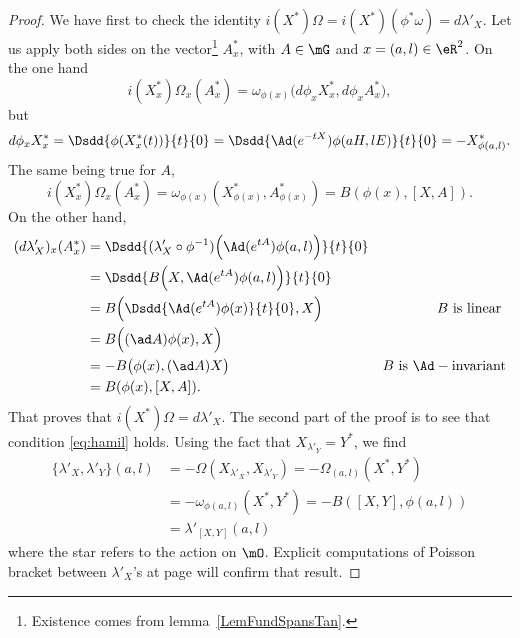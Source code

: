 \begin{proof}
We have first to check the identity $i(X^*)\Omega=i(X^*)(\phi^*\omega)=d\lambda'_X$. Let us apply both sides on the vector\footnote{Existence comes from lemma~\ref{LemFundSpansTan}.} $A^*_x$, with $A\in\mG$ and $x=(a,l)\in\eR^2$. On the one hand
\[
  i(X^*_x)\Omega_x(A^*_x)=\omega_{\phi(x)}\big(   d\phi_xX^*_x,d\phi_xA^*_x   \big),
\]
but
\begin{equation}
  d\phi_xX^*_x=\Dsdd{\phi(X^*_x(t))}{t}{0}
              =\Dsdd{ \Ad(e^{-tX})\phi(aH,lE) }{t}{0}
          =-X^*_{\phi(a,l)}.
\end{equation}
The same being true for $A$,
\[
  i(X^*_x)\Omega_x(A^*_x)=\omega_{\phi(x)}(X^*_{\phi(x)},A^*_{\phi(x)})=B(\phi(x),[X,A]).
\]
On the other hand,
\begin{equation}
\begin{aligned}
    (d\lambda'_X)_x(A^*_x)&=\Dsdd{ (\lambda'_X\circ\phi^{-1})\Big(   \Ad(e^{tA})\phi(a,l)   \Big) }{t}{0}\\
                         &=\Dsdd{  B\Big(X,\Ad(e^{tA})\phi(a,l) \Big)  }{t}{0} \\
                         &=B\Big(  \Dsdd{\Ad(e^{tA})\phi(x)}{t}{0},X   \Big)    & B\text{ is linear }\\
             &=B\Big(  (\ad A)\phi(x),X   \Big)\\
             &=-B\big(\phi(x),(\ad A)X\big) &   B\text{ is }\Ad-\text{invariant}   \\
             &=B(\phi(x),[X,A]).
\end{aligned}
\end{equation}
That proves that $i(X^*)\Omega=d\lambda'_X$.  The second part of the proof is to see that condition \eqref{eq:hamil} holds.  Using the fact that $X_{\lambda'_Y}=Y^*$, we find
\[
\begin{split}
  \{ \lambda'_X,\lambda'_Y \}(a,l)&=-\Omega(X_{\lambda'_X},X_{\lambda'_Y})
        =-\Omega_{(a,l)}(X^*,Y^*)\\
        &=-\omega_{\phi(a,l)}(X^*,Y^*)
        =-B([X,Y],\phi(a,l))\\
        &=\lambda'_{[X,Y]}(a,l)
\end{split}
\]
where the star refers to the action on $\mO$. Explicit computations of Poisson bracket between $\lambda'_X$'s at page \pageref{pg:explic_com_lamb} will confirm that result.

\end{proof}


